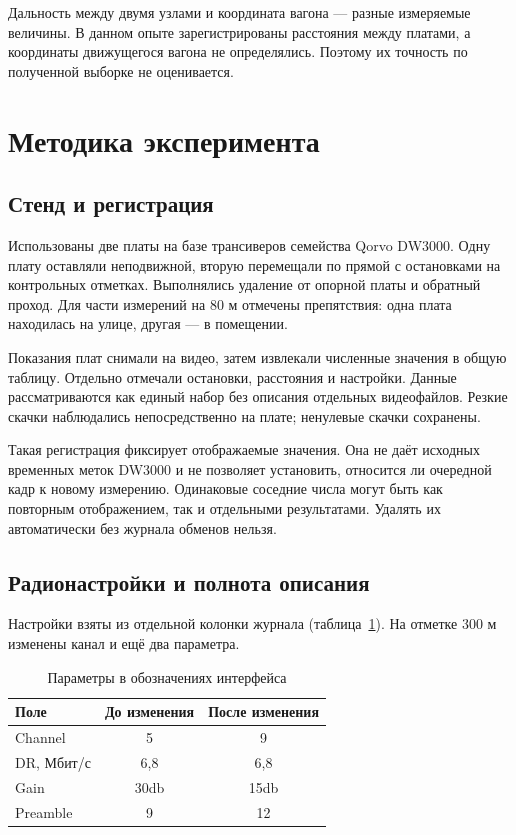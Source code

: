 \documentclass{misisarticle}
\begin{document}
Дальность между двумя узлами и координата вагона --- разные измеряемые величины. В данном опыте зарегистрированы расстояния между платами, а координаты движущегося вагона не определялись. Поэтому их точность по полученной выборке не оценивается.

\section{Методика эксперимента}

\subsection{Стенд и регистрация}

Использованы две платы на базе трансиверов семейства Qorvo DW3000. Одну плату оставляли неподвижной, вторую перемещали по прямой с остановками на контрольных отметках. Выполнялись удаление от опорной платы и обратный проход. Для части измерений на 80 м отмечены препятствия: одна плата находилась на улице, другая --- в помещении.

Показания плат снимали на видео, затем извлекали численные значения в общую таблицу. Отдельно отмечали остановки, расстояния и настройки. Данные рассматриваются как единый набор без описания отдельных видеофайлов. Резкие скачки наблюдались непосредственно на плате; ненулевые скачки сохранены.

Такая регистрация фиксирует отображаемые значения. Она не даёт исходных временных меток DW3000 и не позволяет установить, относится ли очередной кадр к новому измерению. Одинаковые соседние числа могут быть как повторным отображением, так и отдельными результатами. Удалять их автоматически без журнала обменов нельзя.

\subsection{Радионастройки и полнота описания}

Настройки взяты из отдельной колонки журнала (таблица~\ref{tab:settings}). На отметке 300 м изменены канал и ещё два параметра.

\begin{table}[!ht]
\centering
\caption{Параметры в обозначениях интерфейса}
\label{tab:settings}
\begin{tabular}{lcc}
\toprule
Поле & До изменения & После изменения \\
\midrule
Channel & 5 & 9 \\
DR, Мбит/с & 6,8 & 6,8 \\
Gain & 30db & 15db \\
Preamble & 9 & 12 \\
\bottomrule
\end{tabular}
\end{table}
\end{document}
